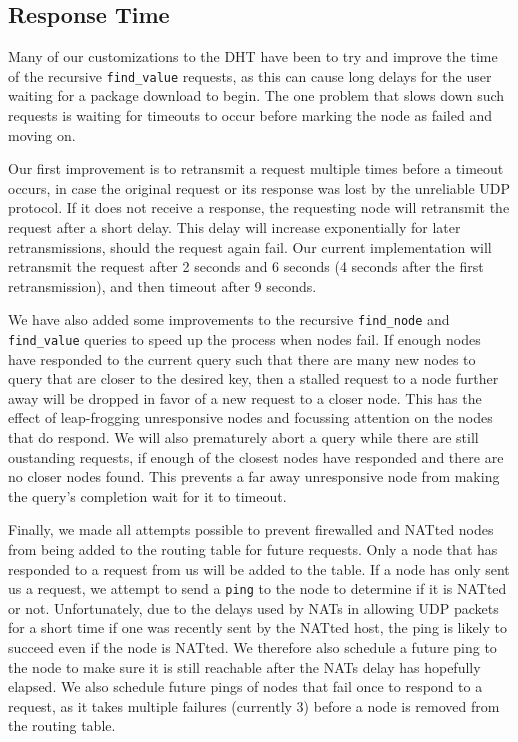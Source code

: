 \documentclass[conference]{IEEEtran}
\begin{document}
\subsection{Response Time}
\label{response_time}

Many of our customizations to the DHT have been to try and improve
the time of the recursive \texttt{find\_value} requests, as this can
cause long delays for the user waiting for a package download to
begin. The one problem that slows down such requests is waiting for
timeouts to occur before marking the node as failed and moving on.

Our first improvement is to retransmit a request multiple times
before a timeout occurs, in case the original request or its
response was lost by the unreliable UDP protocol. If it does not
receive a response, the requesting node will retransmit the request
after a short delay. This delay will increase exponentially for
later retransmissions, should the request again fail. Our current
implementation will retransmit the request after 2 seconds and 6
seconds (4 seconds after the first retransmission), and then timeout
after 9 seconds.

We have also added some improvements to the recursive
\texttt{find\_node} and \texttt{find\_value} queries to speed up the
process when nodes fail. If enough nodes have responded to the
current query such that there are many new nodes to query that are
closer to the desired key, then a stalled request to a node further
away will be dropped in favor of a new request to a closer node.
This has the effect of leap-frogging unresponsive nodes and
focussing attention on the nodes that do respond. We will also
prematurely abort a query while there are still oustanding requests,
if enough of the closest nodes have responded and there are no
closer nodes found. This prevents a far away unresponsive node from
making the query's completion wait for it to timeout.

Finally, we made all attempts possible to prevent firewalled and
NATted nodes from being added to the routing table for future
requests. Only a node that has responded to a request from us will
be added to the table. If a node has only sent us a request, we
attempt to send a \texttt{ping} to the node to determine if it is
NATted or not. Unfortunately, due to the delays used by NATs in
allowing UDP packets for a short time if one was recently sent by
the NATted host, the ping is likely to succeed even if the node is
NATted. We therefore also schedule a future ping to the node to make
sure it is still reachable after the NATs delay has hopefully
elapsed. We also schedule future pings of nodes that fail once to
respond to a request, as it takes multiple failures (currently 3)
before a node is removed from the routing table.
\end{document}
